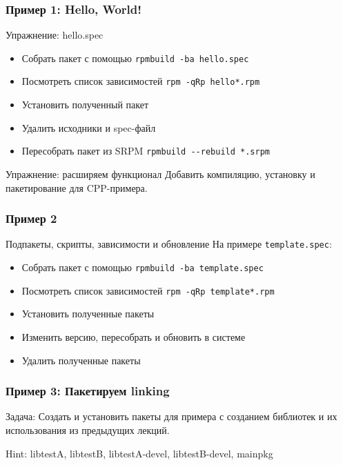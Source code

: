 \begin{frame}
	\frametitle{Пример 1: Hello, World!}

	\begin{block}{Упражнение: hello.spec}
		\begin{itemize}
			\item Собрать пакет с помощью {\tt rpmbuild -ba hello.spec}
			\item Посмотреть список зависимостей {\tt rpm -qRp hello*.rpm}
			\item Установить полученный пакет
			\item Удалить исходники и spec-файл
			\item Пересобрать пакет из SRPM {\tt rpmbuild -{}-rebuild *.srpm}
		\end{itemize}
	\end{block}

	\pause

	\begin{block}{Упражнение: расширяем функционал}
		Добавить компиляцию, установку и пакетирование для CPP-примера.
	\end{block}

\end{frame}

\begin{frame}
	\frametitle{Пример 2}

	\begin{block}{Подпакеты, скрипты, зависимости и обновление}
		На примере {\tt template.spec}:

		\begin{itemize}
			\item Собрать пакет с помощью {\tt rpmbuild -ba template.spec}
			\item Посмотреть список зависимостей {\tt rpm -qRp template*.rpm}
			\item Установить полученные пакеты
			\item Изменить версию, пересобрать и обновить в системе
			\item Удалить полученные пакеты
		\end{itemize}
	\end{block}
\end{frame}

\begin{frame}
	\frametitle{Пример 3: Пакетируем linking}

	\begin{block}{Задача:}
		Создать и установить пакеты для примера с созданием библиотек
		и их использования из предыдущих лекций.
	\end{block}

	Hint: libtestA, libtestB, libtestA-devel, libtestB-devel, mainpkg

\end{frame}

